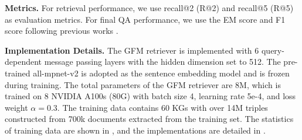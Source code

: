 \noindent\textbf{Metrics.} For retrieval performance, we use recall@2 (R@2) and recall@5 (R@5) as evaluation metrics. For final QA performance, we use the EM score and F1 score following previous works \citep{gutiérrez2024hipporag}.

\noindent\textbf{Implementation Details.} 
The GFM retriever is implemented with 6 query-dependent message passing layers with the hidden dimension set to 512. The pre-trained all-mpnet-v2 \citep{all-mpnet-v2} is adopted as the sentence embedding model and is frozen during training. The total parameters of the GFM retriever are 8M, which is trained on 8 NVIDIA A100s (80G) with batch size 4, learning rate 5e-4, and loss weight $\alpha=0.3$. The training data contains 60 KGs with over 14M triples constructed from 700k documents extracted from the training set. 
The statistics of training data are shown in , and the implementations are detailed in .



